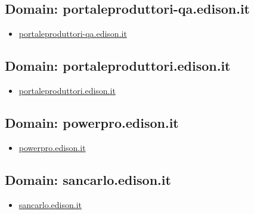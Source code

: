 \documentclass{article}
\begin{document}
    \subsection{Domain: portaleproduttori-qa.edison.it}
    \begin{itemize}
        
            
                
                \item \href{ https://portaleproduttori-qa.edison.it/}{ portaleproduttori-qa.edison.it }
            
        
    \end{itemize}

    \subsection{Domain: portaleproduttori.edison.it}
    \begin{itemize}
        
            
                
                \item \href{ http://portaleproduttori.edison.it/}{ portaleproduttori.edison.it }
            
        
    \end{itemize}

    \subsection{Domain: powerpro.edison.it}
    \begin{itemize}
        
            
                
                \item \href{ https://powerpro.edison.it/fe/}{ powerpro.edison.it }
            
        
    \end{itemize}

    \subsection{Domain: sancarlo.edison.it}
    \begin{itemize}
        
            
                
                \item \href{ https://sancarlo.edison.it/Default.aspx}{ sancarlo.edison.it }
            
        
    \end{itemize}
\end{document}
